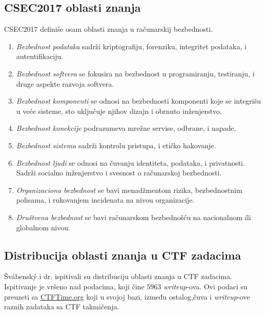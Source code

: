 \documentclass[12pt, a4paper, twocolumn]{article}
\begin{document}
\subsection{CSEC2017 oblasti znanja}

CSEC2017 definiše osam oblasti znanja u računarskij bezbednosti.
\begin{enumerate}
    \item \emph{Bezbednost podataka} sadrži kriptografiju, forenziku, 
        integritet podataka, i autentifikaciju.
    \item \emph{Bezbednost softvera} se fokusira na bezbednost u 
        programiranju, testiranju, i druge aspekte razvoja softvera.
    \item \emph{Bezbednost komponenti} se odnosi na bezbednosti komponenti 
        koje se integrišu u veće sisteme, sto uključuje njihov dizajn i 
        obrnuto inženjerstvo.
    \item \emph{Bezbednost konekcije} podrazumeva mrežne servise, odbrane, i 
        napade.
    \item \emph{Bezbednost sistema} sadrži kontrolu pristupa, i etičko 
        hakovanje.
    \item \emph{Bezbednost ljudi} se odnosi na čuvanju identiteta, podataka, 
        i privatnosti. Sadrži socialno inženjerstvo i svesnost o računarskoj 
        bezbednosti.
    \item \emph{Organizaciona bezbednost} se bavi menadžmentom rizika, 
        bezbednostnim polisama, i rukovanjem incidenata na nivou organizacije.
    \item \emph{Društvena bezbednost} se bavi računarskom bezbednošću 
        na nacionalnom ili globalnom nivou.
\end{enumerate}

\subsection{Distribucija oblasti znanja u CTF zadacima}

Švábenský i dr.\cite{ctf_skills} ispitivali su distribuciju oblasti znanja u 
CTF zadacima. Ispitivanje je vršeno nad podacima, koji čine $5963$ 
\emph{writeup}-ova. Ovi podaci su preuzeti sa \url{CTFTime.org} koji u svojoj 
bazi, između ostalog,čuva i \emph{writeup}-ove raznih zadataka sa CTF 
takmičenja.\cite{ctf_time}
\end{document}
